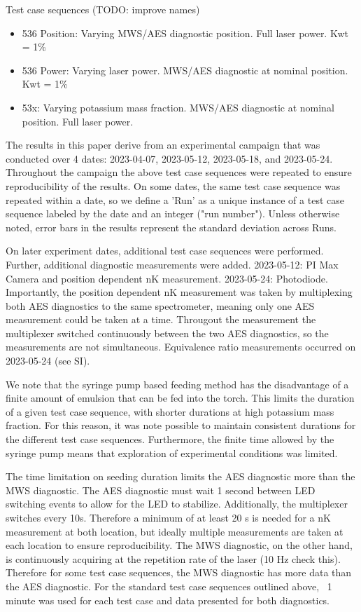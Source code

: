 Test case sequences (TODO: improve names)
\begin{itemize}
    \item 536 Position: Varying MWS/AES diagnostic position. Full laser power. Kwt = 1\%
    \item 536 Power: Varying laser power. MWS/AES diagnostic at nominal position. Kwt = 1\%
    \item 53x: Varying potassium mass fraction. MWS/AES diagnostic at nominal position. Full laser power.
\end{itemize}


The results in this paper derive from an experimental campaign that was conducted over 4 dates: 2023-04-07, 2023-05-12, 2023-05-18, and 2023-05-24. Throughout the campaign the above test case sequences were repeated to ensure reproducibility of the results. On some dates, the same test case sequence was repeated within a date, so we define a 'Run' as a unique instance of a test case sequence labeled by the date and an integer ("run number").  Unless otherwise noted, error bars in the results represent the standard deviation across Runs. 

On later experiment dates, additional test case sequences were performed. Further, additional diagnostic measurements were added. 2023-05-12: PI Max Camera and position dependent nK measurement. 2023-05-24: Photodiode. Importantly, the position dependent nK measurement was taken by multiplexing both AES diagnostics to the same spectrometer, meaning only one AES measurement could be taken at a time. Througout the measurement the multiplexer switched continuously between the two AES diagnostics, so the measurements are not simultaneous. Equivalence ratio measurements occurred on 2023-05-24 (see SI). 

We note that the syringe pump based feeding method has the disadvantage of a finite amount of emulsion that can be fed into the torch. This limits the duration of a given test case sequence, with shorter durations at high potassium mass fraction. For this reason, it was note possible to maintain consistent durations for the different test case sequences. Furthermore, the finite time allowed by the syringe pump means that exploration of experimental conditions was limited. 

The time limitation on seeding duration limits the AES diagnostic more than the MWS diagnostic. The AES diagnostic must wait 1 second between LED switching events to allow for the LED to stabilize. Additionally, the multiplexer switches every 10s. Therefore a minimum of at least 20 s is needed for a nK measurement at both location, but ideally multiple measurements are taken at each location to ensure reproducibility. The MWS diagnostic, on the other hand, is continuously acquiring at the repetition rate of the laser (10 Hz check this). Therefore for some test case sequences, the MWS diagnostic has more data than the AES diagnostic. For the standard test case sequences outlined above, ~1 minute was used for each test case and data presented for both diagnostics.  

